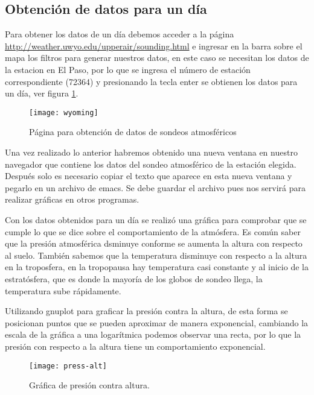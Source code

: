 \documentclass[12pt]{article}
\begin{document}
\subsection{Obtención de datos para un día}
Para obtener los datos de un día debemos acceder a la página \url{http://weather.uwyo.edu/upperair/sounding.html} e ingresar en la barra sobre el mapa los filtros para generar nuestros datos, en este caso se necesitan los datos de la estacion en El Paso, por lo que se ingresa el número de estación correspondiente (72364) y presionando la tecla enter se obtienen los datos para un día, ver figura \ref{fig:wyoming1}.


\begin{figure}[h]
\centering
\texttt{[image: wyoming]}

\caption{Página para obtención de datos de sondeos atmosféricos}
\label{fig:wyoming1}

\end{figure}

Una vez realizado lo anterior habremos obtenido una nueva ventana en nuestro navegador que contiene los datos del sondeo atmosférico de la estación elegida. Después solo es necesario copiar el texto que aparece en esta nueva ventana y pegarlo en un archivo de emacs. Se debe guardar el archivo pues nos servirá para realizar gráficas en otros programas.

Con los datos obtenidos para un día se realizó una gráfica para comprobar que se cumple lo que se dice sobre el comportamiento de la atmósfera. Es común saber que la presión atmosférica dsminuye conforme se aumenta la altura con respecto al suelo.  También sabemos que la temperatura disminuye con respecto a la altura en la troposfera, en la tropopausa hay temperatura casi constante y al inicio de la estratósfera, que es donde la mayoría de los globos de sondeo llega, la temperatura sube rápidamente.\cite{ncsu}

Utilizando gnuplot para graficar la presión contra la altura, de esta forma se posicionan puntos que se pueden aproximar de manera exponencial, cambiando la escala de la gráfica a una logarítmica podemos observar una recta, por lo que la presión con respecto a la altura tiene un comportamiento exponencial.

\begin{figure}[ht!]
\centering

\texttt{[image: press-alt]}

\caption{Gráfica de presión contra altura.}

\label{fig:presal}

\end{figure}
\end{document}
